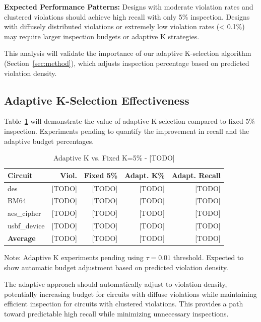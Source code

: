 \documentclass[10pt,twocolumn,journal]{IEEEtran}
\begin{document}
\textbf{Expected Performance Patterns:}
Designs with moderate violation rates and clustered violations should achieve high recall with only 5\% inspection. Designs with diffusely distributed violations or extremely low violation rates (< 0.1\%) may require larger inspection budgets or adaptive K strategies.

This analysis will validate the importance of our adaptive K-selection algorithm (Section~\ref{sec:method}), which adjusts inspection percentage based on predicted violation density.

\subsection{Adaptive K-Selection Effectiveness}

Table~\ref{tab:adaptive_k} will demonstrate the value of adaptive K-selection compared to fixed 5\% inspection. Experiments pending to quantify the improvement in recall and the adaptive budget percentages.

\begin{table}[t]
\centering
\caption{Adaptive K vs. Fixed K=5\% - [TODO]}
\label{tab:adaptive_k}
\begin{tabular}{@{}lrrrr@{}}
\toprule
\textbf{Circuit} & \textbf{Viol.} & \textbf{Fixed 5\%} & \textbf{Adapt. K\%} & \textbf{Adapt. Recall} \\
\midrule
des & [TODO] & [TODO] & [TODO] & [TODO] \\
BM64 & [TODO] & [TODO] & [TODO] & [TODO] \\
aes\_cipher & [TODO] & [TODO] & [TODO] & [TODO] \\
usbf\_device & [TODO] & [TODO] & [TODO] & [TODO] \\
\midrule
\textbf{Average} & [TODO] & [TODO] & [TODO] & [TODO] \\
\bottomrule
\end{tabular}
\vspace{-2mm}
\footnotesize{Note: Adaptive K experiments pending using $\tau=0.01$ threshold. Expected to show automatic budget adjustment based on predicted violation density.}
\end{table}

The adaptive approach should automatically adjust to violation density, potentially increasing budget for circuits with diffuse violations while maintaining efficient inspection for circuits with clustered violations. This provides a path toward predictable high recall while minimizing unnecessary inspections.
\end{document}
